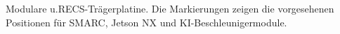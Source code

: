 Modulare u.RECS-Trägerplatine. Die Markierungen zeigen die vorgesehenen Positionen für SMARC, Jetson NX und KI-Beschleunigermodule.
